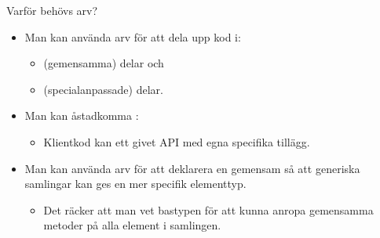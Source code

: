 \begin{Slide}{Varför behövs arv?}
\begin{itemize}
\item Man kan använda arv för att dela upp kod i:
\begin{itemize}
\item {} (gemensamma) delar och
\item {} (specialanpassade) delar.
\end{itemize}

\item Man kan åstadkomma :
\begin{itemize}
\item Klientkod kan   ett givet API med egna specifika tillägg.
\end{itemize}

\item Man kan använda arv för att deklarera en gemensam  så att generiska samlingar kan ges en mer specifik elementtyp.
\begin{itemize}
\item Det räcker att man vet bastypen för att kunna anropa gemensamma metoder på alla element i samlingen.
\end{itemize}
\end{itemize}
\end{Slide}

